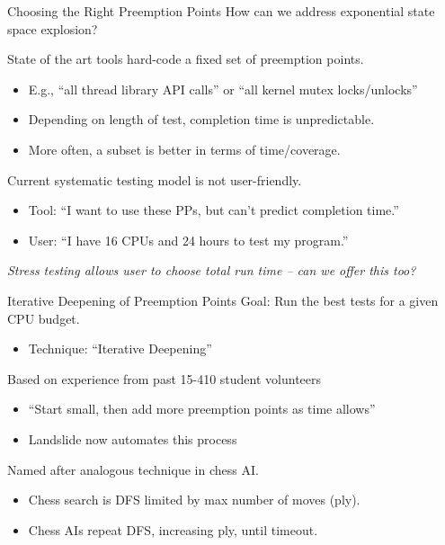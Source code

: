 \documentclass[xcolor=dvipsnames]{beamer}
\begin{document}
\begin{frame}{Choosing the Right Preemption Points}
	How can we address exponential state space explosion?
	\pause
	\linegap

	State of the art tools hard-code a fixed set of preemption points.
	\begin{itemize}
		\item E.g., ``all thread library API calls'' or ``all kernel mutex locks/unlocks''
		\item Depending on length of test, completion time is unpredictable.
		\item More often, a subset is better in terms of time/coverage. 
	\end{itemize}
	\pause
	\linegap
	Current systematic testing model is not user-friendly.
	\begin{itemize}
		\item Tool: ``I want to use these PPs, but can't predict completion time.''
		\item User: ``I have 16 CPUs and 24 hours to test my program.''
	\end{itemize}
	\linegap
	{\em Stress testing allows user to choose total run time -- can we offer this too?}
\end{frame}

\begin{frame}{Iterative Deepening of Preemption Points}
	Goal: Run the best tests for a given CPU budget.
	\begin{itemize}
		\item Technique: ``Iterative Deepening''
	\end{itemize}
	\linegap

	Based on experience from past 15-410 student volunteers
	\begin{itemize}
		\item ``Start small, then add more preemption points as time allows''
		\item Landslide now automates this process
	\end{itemize}
	\linegap

	Named after analogous technique in chess AI.
	\begin{itemize}
		\item Chess search is DFS limited by max number of moves (ply).
		\item Chess AIs repeat DFS, increasing ply, until timeout.
	\end{itemize}
\end{frame}
\end{document}
